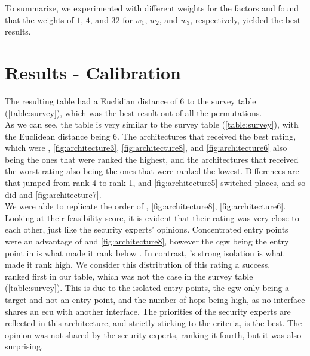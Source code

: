 To summarize, we experimented with different weights for the factors and found that the weights of 
$1$, $4$, and $32$ for $w_{1}$, $w_{2}$, and $w_{3}$, respectively, yielded the best results.


\section{Results - Calibration}
\label{sec:calibration}

The resulting table had a Euclidian distance of 6 to the survey table (\ref{table:survey}), which was the best result out of all the permutations.\\

As we can see, the table is very similar to the survey table (\ref{table:survey}), with the Euclidean distance being 6.
The architectures that received the best rating, which were 
, \ref{fig:architecture3}, \ref{fig:architecture8}, and \ref{fig:architecture6} 
also being the ones that were ranked the highest,
and the architectures that received the worst rating also being the ones that were ranked the lowest.
Differences are that  jumped from rank 4 to rank 1,  and \ref{fig:architecture5} switched places, 
and so did  and \ref{fig:architecture7}.\\

We were able to replicate the order of , \ref{fig:architecture8}, \ref{fig:architecture6}.
Looking at their feasibility score, it is evident that their rating was very close to each other, just like the security experts' opinions.
Concentrated entry points were an advantage of  and \ref{fig:architecture8}, 
however the \acrshort{cgw} being the entry point in  is what made it rank below .
In contrast, 's strong isolation is what made it rank high.
We consider this distribution of this rating a success.\\

 ranked first in our table, which was not the case in the survey table (\ref{table:survey}).
This is due to the isolated entry points, the \acrshort{cgw} only being a target and not an entry point, 
and the number of hops being high, as no interface shares an \acrshort{ecu} with another interface.
The priorities of the security experts are reflected in this architecture, and
strictly sticking to the criteria,  is the best.
The opinion was not shared by the security experts, ranking it fourth, but it was also surprising.\\

